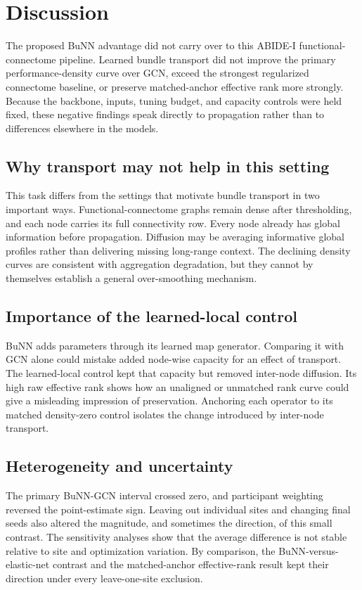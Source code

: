 \section{Discussion}

The proposed BuNN advantage did not carry over to this ABIDE-I
functional-connectome pipeline. Learned bundle transport did not improve the
primary performance-density curve over GCN, exceed the strongest regularized
connectome baseline, or preserve matched-anchor effective rank more strongly.
Because the backbone, inputs, tuning budget, and capacity controls were held
fixed, these negative findings speak directly to propagation rather than to
differences elsewhere in the models.

\subsection{Why transport may not help in this setting}

This task differs from the settings that motivate bundle transport in two
important ways. Functional-connectome graphs remain dense after thresholding,
and each node carries its full connectivity row. Every node already has global
information before propagation. Diffusion may be averaging informative global
profiles rather than delivering missing long-range context. The declining
density curves are consistent with aggregation degradation, but they cannot by
themselves establish a general over-smoothing mechanism.

\subsection{Importance of the learned-local control}

BuNN adds parameters through its learned map generator. Comparing it with GCN
alone could mistake added node-wise capacity for an effect of transport. The
learned-local control kept that capacity but removed inter-node diffusion. Its
high raw effective rank shows how an unaligned or unmatched rank curve could
give a misleading impression of preservation. Anchoring each operator to its
matched density-zero control isolates the change introduced by inter-node
transport.

\subsection{Heterogeneity and uncertainty}

The primary BuNN-GCN interval crossed zero, and participant weighting reversed
the point-estimate sign. Leaving out individual sites and changing final seeds
also altered the magnitude, and sometimes the direction, of this small
contrast. The sensitivity analyses show that the average difference is not
stable relative to site and optimization variation. By comparison, the
BuNN-versus-elastic-net contrast and the matched-anchor effective-rank result
kept their direction under every leave-one-site exclusion.

